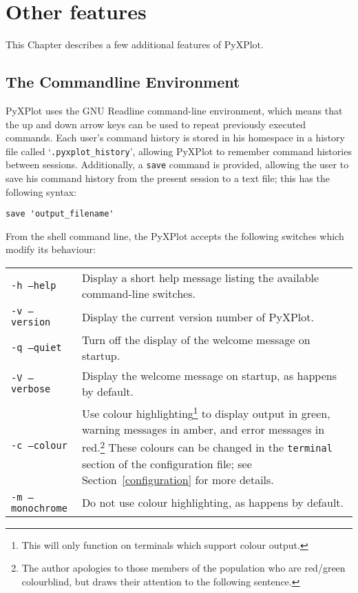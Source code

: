 \chapter{Other features}

This Chapter describes a few additional features of PyXPlot.

\section{The Commandline Environment}

PyXPlot uses the GNU Readline command-line environment, which means that the up
and down arrow keys can be used to repeat previously executed commands. Each
user's command history is stored in his homespace in a history file called
`\texttt{.pyxplot\_history}', allowing PyXPlot to remember command histories
between sessions. Additionally, a \texttt{save} command is provided, allowing
the user to save his command history from the present session to a text file;
this has the following syntax:

\begin{verbatim}
save 'output_filename'
\end{verbatim}

From the shell command line, the PyXPlot accepts the following switches which
modify its behaviour:

\begin{longtable}{p{3.5cm}p{8.5cm}}
\texttt{-h --help} & Display a short help message listing the available command-line switches.\\
\texttt{-v --version} & Display the current version number of PyXPlot.\\
\texttt{-q --quiet} & Turn off the display of the welcome message on startup. \\
\texttt{-V --verbose} & Display the welcome message on startup, as happens by default. \\
\texttt{-c --colour} & Use colour highlighting\footnote{This will only function on terminals which support colour output.} to display output in green, warning messages in amber, and error messages in red.\footnote{The author apologies to those members of the population who are red/green colourblind, but draws their attention to the following sentence.} These colours can be changed in the \texttt{terminal} section of the configuration file; see Section~\ref{configuration} for more details. \\
\texttt{-m --monochrome} & Do not use colour highlighting, as happens by default. \\
\end{longtable}

